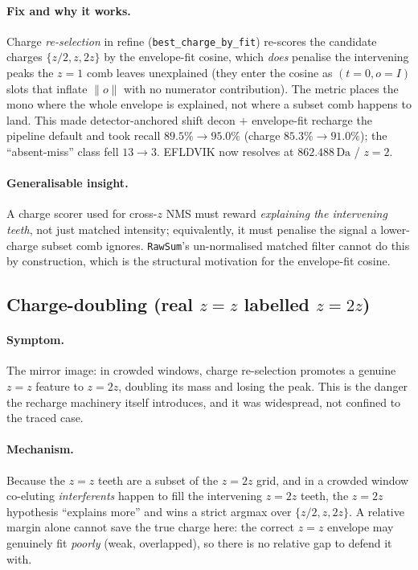 \documentclass[11pt]{article}
\newcommand{\Da}{\,\text{Da}}
\newcommand{\zeq}[1]{\ensuremath{z{=}#1}}
\begin{document}
\paragraph{Fix and why it works.} Charge \emph{re-selection} in refine
(\texttt{best\_charge\_by\_fit}) re-scores the candidate charges $\{z/2, z, 2z\}$ by the
envelope-fit cosine, which \emph{does} penalise the intervening peaks the \zeq{1} comb leaves
unexplained (they enter the cosine as $(t=0, o=I)$ slots that inflate $\lVert o \rVert$ with no
numerator contribution). The metric places the mono where the whole envelope is explained, not
where a subset comb happens to land. This made detector-anchored shift decon $+$ envelope-fit
recharge the pipeline default and took recall $89.5\% \rightarrow 95.0\%$ (charge $85.3\%
\rightarrow 91.0\%$); the ``absent-miss'' class fell $13 \rightarrow 3$. EFLDVIK now resolves at
$862.488\Da$ / \zeq{2}.

\paragraph{Generalisable insight.} A charge scorer used for cross-$z$ NMS must reward
\emph{explaining the intervening teeth}, not just matched intensity; equivalently, it must
penalise the signal a lower-charge subset comb ignores. \texttt{RawSum}'s un-normalised matched
filter cannot do this by construction, which is the structural motivation for the envelope-fit
cosine.

\subsection{Charge-doubling (real \boldmath\zeq{z} labelled \zeq{2z})}
\label{sec:doubling}

\paragraph{Symptom.} The mirror image: in crowded windows, charge re-selection promotes a genuine
\zeq{z} feature to \zeq{2z}, doubling its mass and losing the peak. This is the danger the
recharge machinery itself introduces, and it was widespread, not confined to the traced case.

\paragraph{Mechanism.} Because the \zeq{z} teeth are a subset of the \zeq{2z} grid, and in a
crowded window co-eluting \emph{interferents} happen to fill the intervening \zeq{2z} teeth, the
\zeq{2z} hypothesis ``explains more'' and wins a strict argmax over $\{z/2, z, 2z\}$. A relative
margin alone cannot save the true charge here: the correct \zeq{z} envelope may genuinely fit
\emph{poorly} (weak, overlapped), so there is no relative gap to defend it with.
\end{document}
